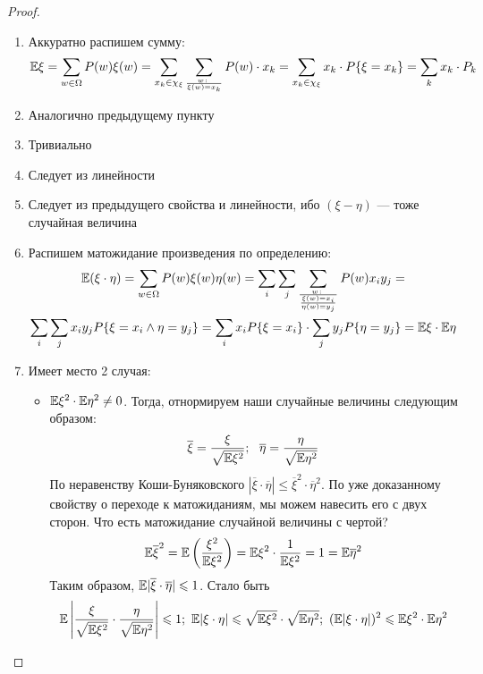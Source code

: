 \begin{proof}~
	\begin{enumerate}
		\item Аккуратно распишем сумму:
		\[
			\mathbb{E}\xi = \sum_{w \in \Omega} P(w)\xi(w) = \sum_{x_k \in \chi_\xi} \sum_{w \colon \over \xi(w) = x_k} P(w) \cdot x_k = \sum_{x_k \in \chi_\xi} x_k \cdot P\{\xi = x_k\} = \sum_k x_k \cdot P_k
		\]
		
		\item Аналогично предыдущему пункту
		
		\item Тривиально
		
		\item Следует из линейности
		
		\item Следует из предыдущего свойства и линейности, ибо $(\xi - \eta)$ --- тоже случайная величина
		
		\item Распишем матожидание произведения по определению:
		\begin{multline*}
			\mathbb{E}(\xi \cdot \eta) = \sum_{w \in \Omega} P(w) \xi(w) \eta(w) = \sum_i \sum_j \sum_{w \colon \over { \xi(w) = x_i \over \eta(w) = y_j}} P(w) x_i y_j =
			\\
			\sum_i \sum_j x_i y_j P\{\xi = x_i \wedge \eta = y_j\} = \sum_i x_i P\{\xi = x_i\} \cdot \sum_j y_j P\{\eta = y_j\} = \mathbb{E}\xi \cdot \mathbb{E}\eta
		\end{multline*}
		
		\item Имеет место 2 случая:
		\begin{itemize}
			\item $\mathbb{E}\xi^2 \cdot \mathbb{E}\eta^2 \neq 0$. Тогда, отнормируем наши случайные величины следующим образом:
			\[
				\overline{\xi} = \frac{\xi}{\sqrt{\E\xi^2}};\ \ \overline{\eta} = \frac{\eta}{\sqrt{\E\eta^2}}
			\]
			По неравенству Коши-Буняковского $|\overline{\xi} \cdot \overline{\eta}| \le \overline{\xi}^2 \cdot \overline{\eta}^2$. По уже доказанному свойству о переходе к матожиданиям, мы можем навесить его с двух сторон. Что есть матожидание случайной величины с чертой?
			\[
				\mathbb{E}\overline{\xi}^2 = \mathbb{E}\left(\frac{\xi^2}{\mathbb{E}\xi^2}\right) = \mathbb{E}\xi^2 \cdot \frac{1}{\mathbb{E}\xi^2} = 1 = \mathbb{E}\overline{\eta}^2
			\]
			Таким образом, $\mathbb{E}|\overline{\xi} \cdot \overline{\eta}| \leqslant 1$. Стало быть
			\[
				\mathbb{E}\left|\frac{\xi}{\sqrt{\mathbb{E}\xi^2}} \cdot \frac{\eta}{\sqrt{\mathbb{E}\eta^2}}\right| \leqslant 1;\ \mathbb{E}|\xi \cdot \eta| \leqslant \sqrt{\mathbb{E}\xi^2} \cdot \sqrt{\mathbb{E}\eta^2};\ (\mathbb{E}|\xi \cdot \eta|)^2 \leqslant \mathbb{E}\xi^2 \cdot \mathbb{E}\eta^2
			\]
			

\end{itemize}
\end{enumerate}
\end{proof}
